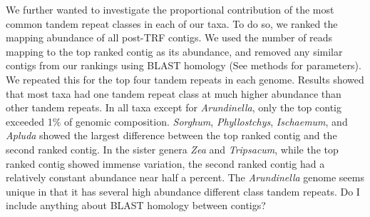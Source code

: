 \documentclass[10pt,letterpaper]{article}
\begin{document}
We further wanted to investigate the proportional contribution of the most common tandem repeat classes in each of our taxa.
To do so, we ranked the mapping abundance of all post-TRF contigs.
We used the number of reads mapping to the top ranked contig as its abundance, and removed any similar contigs from our rankings using BLAST homology (See methods for parameters).
We repeated this for the top four tandem repeats in each genome.
Results showed that most taxa had one tandem repeat class at much higher abundance than other tandem repeats.
In all taxa except for \emph{Arundinella}, only the top contig exceeded 1\% of genomic composition.
\emph{Sorghum}, \emph{Phyllostchys}, \emph{Ischaemum}, and \emph{Apluda} showed the largest difference between the top ranked contig and the second ranked contig.
In the sister genera \emph{Zea} and \emph{Tripsacum}, while the top ranked contig showed immense variation, the second ranked contig had a relatively constant abundance near half a percent.
The \emph{Arundinella} genome seems unique in that it has several high abundance different class tandem repeats.
Do I include anything about BLAST homology between contigs?
\end{document}
